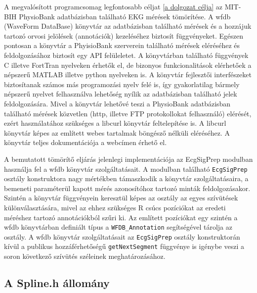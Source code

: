 \documentclass[oneside,titlepage,12pt,a4paper]{report}
\begin{document}
A megvalósított programcsomag legfontosabb céljat \ref{a dolgozat célja} az MIT-BIH PhysioBank adatbázisban található EKG mérések tömörítése. A wfdb (WaveForm DataBase) könyvtár az adatbázisban található mérések és a hozzájuk tartozó orvosi jelölések (annotációk) kezeléséhez biztosít függvényeket. Egészen pontosan a könyvtár a PhyisioBank szerverein található mérések eléréséhez és feldolgozásához biztosít egy API felüleletet. A könyvtárban található függvények C illetve FortTran nyelveken érhetők el, de bizonyos funkcionalitások elérhetőek a népszerű MATLAB illetve python nyelveken is. A könyvtár fejlesztői interfészeket biztosítanak számos más programozási nyelv felé is, így gyakorlatilag bármely népszerű nyelvet felhasználva lehetőség nyílik az adatbázisban található jelek feldolgozására. Mivel a könyvtár lehetővé teszi a PhysioBank adatbázisban található mérések közvetlen (http, illetve FTP protokollokat felhasználó) elérését, ezért használatához szükséges a libcurl könyvtár feltelepítése is. A libcurl könyvtár képes az említett webes tartalmak böngésző nélküli eléréséhez. A könyvtár teljes dokumentációja a \cite{wfdbEler} webcímen érhető el. 
\par A bemutatott tömörítő eljárás jelenlegi implementációja az EcgSigPrep modulban használja fel a wfdb könyvtár szolgáltatásait. A modulban található \texttt{EcgSigPrep} osztály konstruktora nagy mértékben támaszkodik a könyvtár szolgáltatásaira, a bemeneti paraméterül kapott mérés azonosítóhoz tartozó minták feldolgozásakor. Szintén a könyvtár függvényein keresztül képes az osztály az egyes szívütések különválasztására, mivel az ehhez szükséges R csúcs pozíciókat az eredeti méréshez tartozó annotációkból szűri ki. Az említett pozíciókat egy szintén a wfdb könyvtárban definiált típus a \texttt{WFDB\_Annotation} segítségével tárolja az osztály. A wfdb könyvtár szolgáltatásait az \texttt{EcgSigPrep} osztály konstruktorán kívül a publikus hozzáférhetőségű \texttt{getNextSegment} függvénye is igénybe veszi a soron következő szívütés széleinek meghatározásához. 

\subsection*{A Spline.h állomány}
\end{document}
